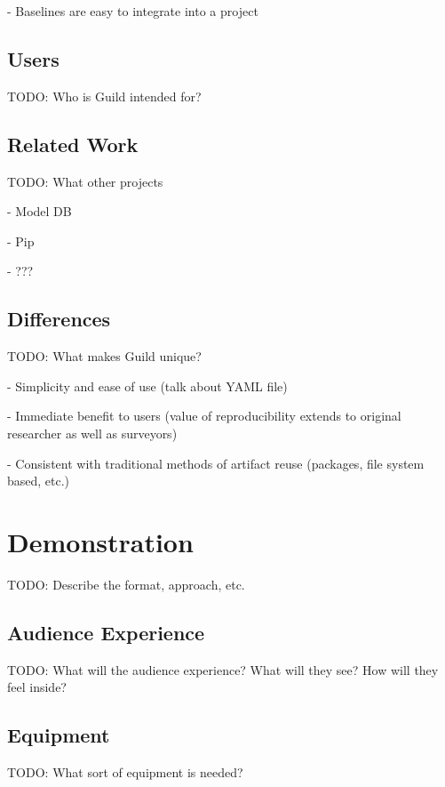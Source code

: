 \documentclass{article}
\begin{document}
- Baselines are easy to integrate into a project

\subsection{Users}

TODO: Who is Guild intended for?

\subsection{Related Work}

TODO: What other projects

- Model DB

- Pip

- ???

\subsection{Differences}

TODO: What makes Guild unique?

- Simplicity and ease of use (talk about YAML file)

- Immediate benefit to users (value of reproducibility extends to
original researcher as well as surveyors)

- Consistent with traditional methods of artifact reuse (packages,
file system based, etc.)

\section{Demonstration}

TODO: Describe the format, approach, etc.

\subsection{Audience Experience}

TODO: What will the audience experience? What will they see? How will
they feel inside?

\subsection{Equipment}

TODO: What sort of equipment is needed?



\end{document}
